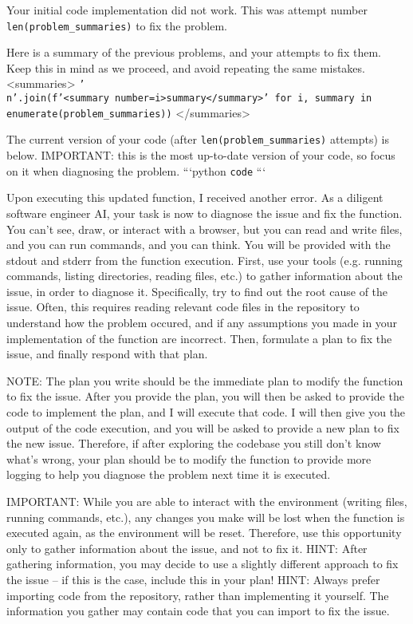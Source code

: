 \begin{tcolorbox}[title={\texttt{Diagnose User Instructions}}]

Your initial code implementation did not work. This was attempt number \texttt{{len(problem\_summaries)}} to fix the problem.

Here is a summary of the previous problems, and your attempts to fix them. Keep this in mind as we proceed, and avoid repeating the same mistakes.
<summaries>
\texttt{{'\\n'.join(f'<summary number={i}>{summary}</summary>' for i, summary in enumerate(problem\_summaries))}}
</summaries>

The current version of your code (after \texttt{{len(problem\_summaries)}} attempts) is below.
IMPORTANT: this is the most up-to-date version of your code, so focus on it when diagnosing the problem.
```python
\texttt{{code}}
```

Upon executing this updated function, I received another error.
As a diligent software engineer AI, your task is now to diagnose the issue and fix the function.
You can't see, draw, or interact with a browser, but you can read and write files, and you can run commands, and you can think.
You will be provided with the stdout and stderr from the function execution.
First, use your tools (e.g. running commands, listing directories, reading files, etc.) to gather information about the issue, in order to diagnose it.
Specifically, try to find out the root cause of the issue. Often, this requires reading relevant code files in the repository to understand how the problem occured, and if any assumptions you made in your implementation of the function are incorrect.
Then, formulate a plan to fix the issue, and finally respond with that plan.

NOTE: The plan you write should be the immediate plan to modify the function to fix the issue. 
After you provide the plan, you will then be asked to provide the code to implement the plan, and I will execute that code. 
I will then give you the output of the code execution, and you will be asked to provide a new plan to fix the new issue. 
Therefore, if after exploring the codebase you still don't know what's wrong, your plan should be to modify the function to provide more logging to help you diagnose the problem next time it is executed.

IMPORTANT: While you are able to interact with the environment (writing files, running commands, etc.), any changes you make will be lost when the function is executed again, as the environment will be reset. Therefore, use this opportunity only to gather information about the issue, and not to fix it.
HINT: After gathering information, you may decide to use a slightly different approach to fix the issue -- if this is the case, include this in your plan! 
HINT: Always prefer importing code from the repository, rather than implementing it yourself. The information you gather may contain code that you can import to fix the issue.


\end{tcolorbox}
